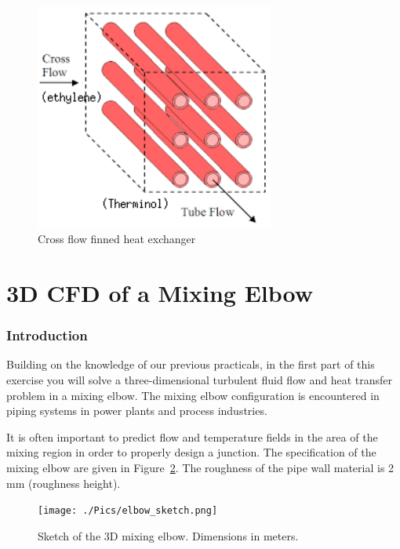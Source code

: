 \documentclass[12pts,a4paper,amsmath,amssymb,floatfix]{article}%
\begin{document}
\begin{figure}[H]
  \begin{center}
     \includegraphics[width=0.7\textwidth,clip]{./Pics/HE_Finned.png}
     \caption{Cross flow finned heat exchanger}\label{HE_Finned}
  \end{center}
\end{figure}




\part{ 3D CFD of a Mixing Elbow}

\section{Introduction}
Building on the knowledge of our previous practicals, in the first part of this exercise you will solve a three-dimensional turbulent fluid flow and heat transfer problem in a mixing elbow. The mixing elbow configuration is encountered in piping systems in power plants and process industries. 

It is often important to predict flow and temperature fields in the area of the mixing region in order to properly design a junction. The specification of the mixing elbow are given in Figure~\ref{Design1:Sketch1}. The roughness of the pipe wall material is 2\,mm (roughness height). 
\begin{figure}[H]
\begin{center}
\texttt{[image: ./Pics/elbow\_sketch.png]}
\end{center}
\caption{Sketch of the 3D mixing elbow. Dimensions in meters.}\label{Design1:Sketch1}
\end{figure}
\end{document}
